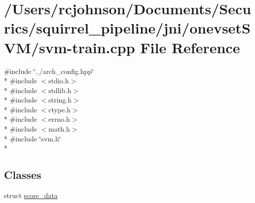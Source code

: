 \hypertarget{svm-train_8cpp}{\section{/\-Users/rcjohnson/\-Documents/\-Securics/squirrel\-\_\-pipeline/jni/onevset\-S\-V\-M/svm-\/train.cpp File Reference}
\label{svm-train_8cpp}
}
{\ttfamily \#include \char`\"{}../arch\-\_\-config.\-hpp\char`\"{}}\\*
{\ttfamily \#include $<$stdio.\-h$>$}\\*
{\ttfamily \#include $<$stdlib.\-h$>$}\\*
{\ttfamily \#include $<$string.\-h$>$}\\*
{\ttfamily \#include $<$ctype.\-h$>$}\\*
{\ttfamily \#include $<$errno.\-h$>$}\\*
{\ttfamily \#include $<$math.\-h$>$}\\*
{\ttfamily \#include \char`\"{}svm.\-h\char`\"{}}\\*
\subsection*{Classes}
\begin{DoxyCompactItemize}
\item 
struct \hyperlink{structscore__data}{score\-\_\-data}
\end{DoxyCompactItemize}

